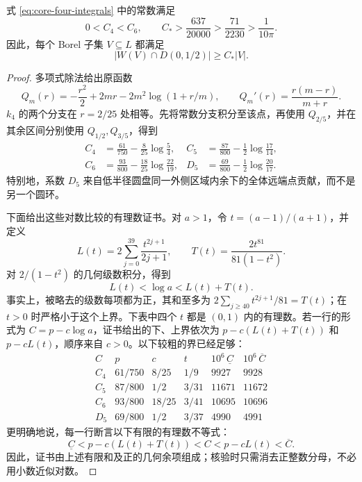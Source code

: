 \begin{lemma}[内圆盘贡献的精确大小]
\label{lem:core-constants}
式 \eqref{eq:core-four-integrals} 中的常数满足
\[
 0<C_4<C_6,\qquad
 C_*>\frac{637}{20000}>\frac{71}{2230}>\frac1{10\pi}.
\]
因此，每个 Borel 子集 $V\subseteq L$ 都满足
\begin{equation}
                 |W(V)\cap D(0,1/2)|\geq C_*|V|.
\label{eq:core-low-result}
\end{equation}
\end{lemma}

\begin{proof}
多项式除法给出原函数
\[
 Q_m(r)=-\frac{r^2}{2}+2mr-2m^2\log(1+r/m),\qquad
 Q_m'(r)=\frac{r(m-r)}{m+r}.
\]
$k_4$ 的两个分支在 $r=2/25$ 处相等。先将常数分支积分至该点，再使用 $Q_{2/5}$，并在其余区间分别使用 $Q_{1/2},Q_{3/5}$，得到
\begin{align}
 C_4&=\frac{61}{750}-\frac8{25}\log\frac54,
 &C_5&=\frac{87}{800}-\frac12\log\frac{17}{14},\nonumber\\
 C_6&=\frac{93}{800}-\frac{18}{25}\log\frac{22}{19},
 &D_5&=\frac{69}{800}-\frac12\log\frac{20}{17}.
\label{eq:core-four-closed}
\end{align}
特别地，系数 $D_5$ 来自低半径圆盘同一外侧区域内余下的全体远端点贡献，而不是另一个圆环。

下面给出这些对数比较的有理数证书。对 $a>1$，令 $t=(a-1)/(a+1)$，并定义
\[
 L(t)=2\sum_{j=0}^{39}\frac{t^{2j+1}}{2j+1},\qquad
 T(t)=\frac{2t^{81}}{81(1-t^2)}.
\]
对 $2/(1-t^2)$ 的几何级数积分，得到
\begin{equation}
                    L(t)<\log a<L(t)+T(t).
\label{eq:core-log-certificate}
\end{equation}
事实上，被略去的级数每项都为正，其和至多为 $2\sum_{j\geq40}t^{2j+1}/81=T(t)$；在 $t>0$ 时严格小于这个上界。下表中四个 $t$ 都是 $(0,1)$ 内的有理数。若一行的形式为 $C=p-c\log a$，证书给出的下、上界依次为 $p-c(L(t)+T(t))$ 和 $p-cL(t)$，顺序来自 $c>0$。以下较粗的界已经足够：
\[
\begin{array}{c|c|c|c|c|c}
 C&p&c&t&10^6\,\underline C&10^6\,\overline C\\ \hline
 C_4&61/750&8/25&1/9&9927&9928\\
 C_5&87/800&1/2&3/31&11671&11672\\
 C_6&93/800&18/25&3/41&10695&10696\\
 D_5&69/800&1/2&3/37&4990&4991
\end{array}
\]
更明确地说，每一行断言以下有限的有理数不等式：
\begin{equation}
 \underline C<p-c(L(t)+T(t))<C<p-cL(t)<\overline C.
\label{eq:core-rational-rows}
\end{equation}
因此，证书由上述有限和及正的几何余项组成；核验时只需消去正整数分母，不必用小数近似对数。


\end{proof}
